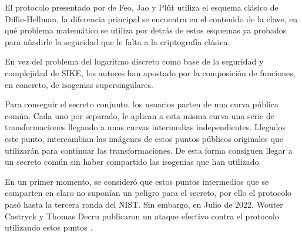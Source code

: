  El protocolo presentado por de Feo, Jao y Plût utiliza el esquema clásico de Diffie-Hellman, la diferencia principal se encuentra en el contenido de la clave, en qué problema matemático se utiliza por detrás de estos esquemas ya probados para añadirle la seguridad que le falta a la criptografía clásica.
 
En vez del problema del logaritmo discreto como base de la seguridad y complejidad de SIKE, los autores han apostado por la composición de funciones, en concreto, de isogenias supersingulares.

Para conseguir el secreto conjunto, los usuarios parten de una curva pública común. Cada uno por separado, le aplican a esta misma curva una serie de transformaciones llegando a unas curvas intermedias independientes. Llegados este punto, intercambian las imágenes de estos puntos públicos originales que utilizarán para continuar las transformaciones. De esta forma consiguen llegar a un secreto común sin haber compartido las isogenias que han utilizado.

En un primer momento, se consideró que estos puntos intermedios que se comparten en claro no suponían un peligro para el secreto, por ello el protocolo pasó hasta la tercera ronda del NIST. Sin embargo, en Julio de 2022, Wouter Castryck y Thomas Decru publicaron un ataque efectivo contra el protocolo utilizando estos puntos \cite{efficient_attack}.

